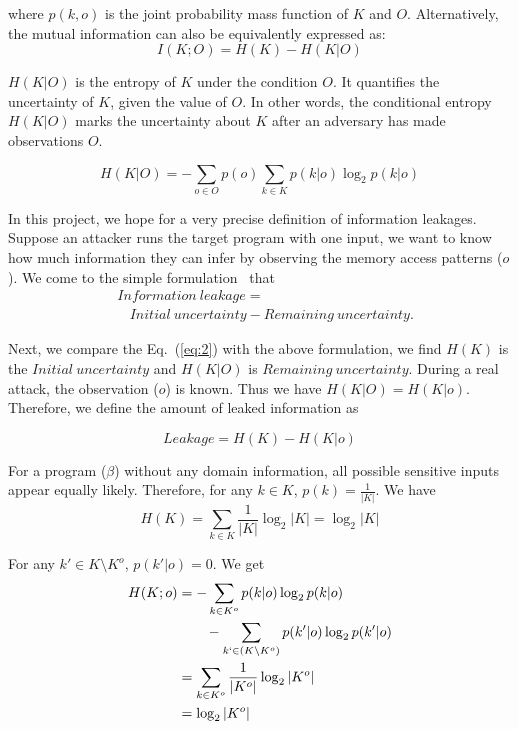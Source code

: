 where $p(k, o)$ is the joint probability mass function of $K$ and $O$.
Alternatively, the mutual information can also be equivalently expressed as:
\begin{equation} \label{eq:2}
    I(K;O) = H(K) - H(K|O)
\end{equation}

$H(K|O)$ is the entropy of $K$ under the condition $O$. It quantifies the
uncertainty of $K$, given the value of $O$. In other words, the conditional 
entropy $H(K|O)$ marks the uncertainty about $K$ after an adversary has 
made observations $O$.

\begin{equation}
    H(K|O) = - \sum_{o {\in} O} {p(o) \sum_{k {\in} K}{p(k|o)\log_2p(k|o)}}
\end{equation}

In this project, we hope for a very precise definition of information
leakages. Suppose an attacker runs the target program with one
input, we want to know how much information they can infer by observing the
memory access patterns ($o$). We come to the simple formulation~\cite{10.1007/978-3-642-00596-1_21,AskarovC12} %
that
\begin{align*}
     & \mathit{Information\ leakage} =                                         \\
     & ~~~~ \mathit{Initial\ uncertainty} - \mathit{Remaining\ uncertainty}.
\end{align*}

Next, we compare the Eq.~(\ref{eq:2}) with the above formulation, we find $H(K)$
is the $\mathit{Initial\ uncertainty}$ and $H(K|O)$ is $\mathit{Remaining\
uncertainty}$. During a real attack, the observation ($o$) is known. Thus we
have $H(K|O) = H(K|o)$. Therefore, we define the amount of leaked information as

\begin{displaymath}
    Leakage = H(K) - H(K|o)
\end{displaymath}

For a program ($\beta$) without any domain information, all possible sensitive
inputs appear equally likely. Therefore, for any $k \in K$, $p(k) =
\frac{1}{|K|}$. We have
$$H(K) = \sum_{k {\in} K}\frac{1}{|K|}\log_2{|K|} = \log_2{|K|}$$

For any $k' \in K \setminus K^o$, $p(k'|o) = 0$. We get
\begin{align*}
    H(K;o) & = - \sum_{k {\in} K^o}{p(k|o)\log_2p(k|o)}                         \\
           & \qquad   - \sum_{k` {\in} (K \setminus K^o)}{p(k'|o)\log_2p(k'|o)} \\
           & = \sum_{k {\in} K^o}\frac{1}{|K^o|}\log_2{|K^o|}                   \\
           & = \log_2{|K^o|}
\end{align*}

